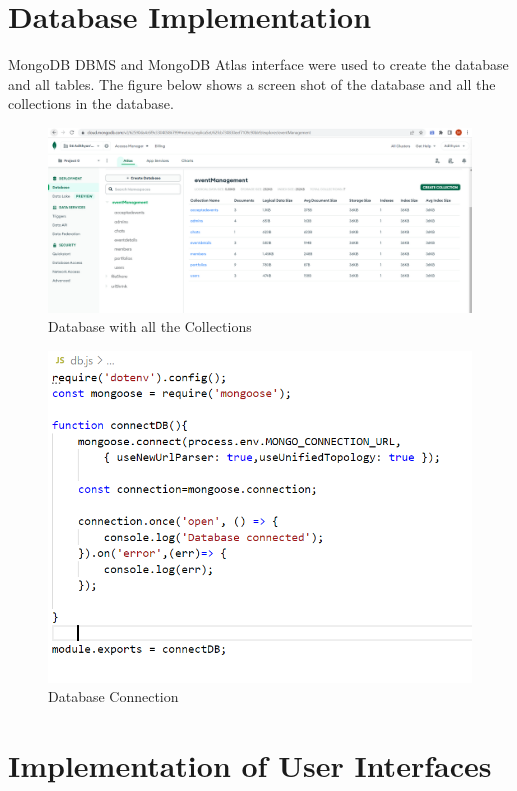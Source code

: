 \section{Database Implementation  }
\hspace{.2cm} 
MongoDB DBMS and MongoDB Atlas interface were used to create the database and all 
tables. The 
figure below shows a screen shot of the database and all the collections in the database. 
\begin{figure}[h]
	\centering
	\includegraphics[scale=0.3]{DbImplementation.png}
	\caption{Database with all the Collections}
	\label{Database with all the Collections}
\end{figure}
\begin{figure}[h]
	\centering
	\includegraphics[scale=0.4]{DBconnection.png}
	\caption{Database Connection}
	\label{Database Connection}
\end{figure}
\section{ Implementation of User Interfaces   }


